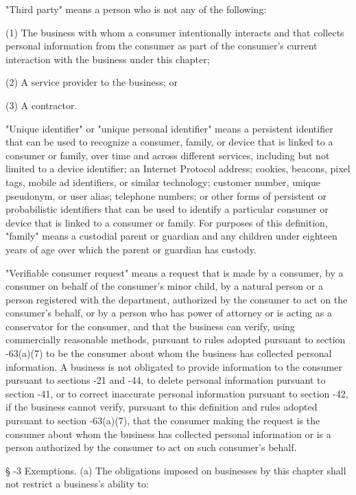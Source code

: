      "Third party" means a person who is not any of the following:

     (1)  The business with whom a consumer intentionally interacts and that collects personal information from the consumer as part of the consumer's current interaction with the business under this chapter;

     (2)  A service provider to the business; or

     (3)  A contractor.

     "Unique identifier" or "unique personal identifier" means a persistent identifier that can be used to recognize a consumer, family, or device that is linked to a consumer or family, over time and across different services, including but not limited to a device identifier; an Internet Protocol address; cookies, beacons, pixel tags, mobile ad identifiers, or similar technology; customer number, unique pseudonym, or user alias; telephone numbers; or other forms of persistent or probabilistic identifiers that can be used to identify a particular consumer or device that is linked to a consumer or family.  For purposes of this definition, "family" means a custodial parent or guardian and any children under eighteen years of age over which the parent or guardian has custody.

     "Verifiable consumer request" means a request that is made by a consumer, by a consumer on behalf of the consumer's minor child, by a natural person or a person registered with the department, authorized by the consumer to act on the consumer's behalf, or by a person who has power of attorney or is acting as a conservator for the consumer, and that the business can verify, using commercially reasonable methods, pursuant to rules adopted pursuant to section    -63(a)(7) to be the consumer about whom the business has collected personal information.  A business is not obligated to provide information to the consumer pursuant to sections    -21 and    -44, to delete personal information pursuant to section    -41, or to correct inaccurate personal information pursuant to section    -42, if the business cannot verify, pursuant to this definition and rules adopted pursuant to section    -63(a)(7), that the consumer making the request is the consumer about whom the business has collected personal information or is a person authorized by the consumer to act on such consumer's behalf.

     §   -3  Exemptions.  (a)  The obligations imposed on businesses by this chapter shall not restrict a business's ability to:

